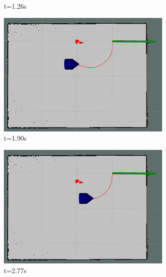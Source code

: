 \begin{figure}[ht]
\begin{subfigure}[b]{0.30\linewidth}
        \caption{t=1.26s}
    \end{subfigure}
    \begin{subfigure}[b]{0.30\linewidth}
        \centering
        \includegraphics[width=0.95\textwidth]{images/spline_single_1_obs/1/5190.png}
        \caption{t=1.90s}
    \end{subfigure}%
    \begin{subfigure}[b]{0.30\linewidth}
        \centering
        \includegraphics[width=0.95\textwidth]{images/spline_single_1_obs/1/5277.png}
        \caption{t=2.77s}
    \end{subfigure}%
    \begin{subfigure}[b]{0.30\linewidth}
        \centering

\end{subfigure}
\end{figure}
